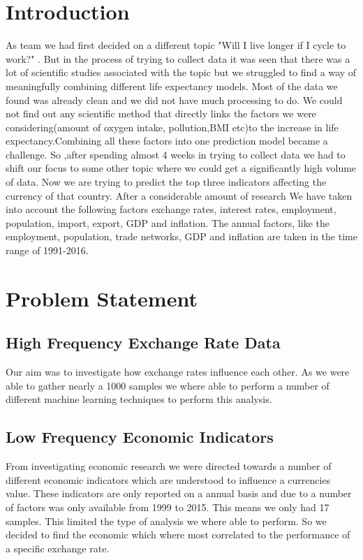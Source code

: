\section{Introduction}
As team we had first decided on a different topic "Will I live longer if I cycle to work?" . But in the process of trying to collect data it was seen that there was a lot of scientific studies associated with the topic but we struggled to find a way of meaningfully combining different life expectancy models.  Most of the data we found was already clean and we did not have much processing to do\cite{iacono2008access}. We could not find out any scientific method that directly links the factors we were considering(amount of oxygen intake, pollution,BMI etc)to the increase in life expectancy\cite{edwards2014spinning}.Combining all these factors into one prediction model became a challenge.
\newline
So ,after spending almost 4 weeks in trying to collect data we had to shift our focus to some other topic where we could get a significantly high volume of data.  Now we are trying to predict the top three indicators affecting the currency of that country.  After a considerable amount of research We have taken into account the following factors exchange rates, interest rates, employment, population, import, export, GDP and inflation\cite{kuruwitaarachchi2018design}.  The annual factors, like the employment, population, trade networks, GDP and inflation are taken in the time range of 1991-2016.

\section{Problem Statement}
\subsection{High Frequency Exchange Rate Data}
Our aim was to investigate how exchange rates influence each other.  As we were able to gather nearly a 1000 samples we where able to perform a number of different machine learning techniques to perform this analysis.

\subsection{Low Frequency Economic Indicators}
From investigating economic research we were directed towards a number of different economic indicators which are understood to influence a currencies value.  These indicators are only reported on a annual basis and due to a number of factors was only available from 1999 to 2015.  This means we only had 17 samples.  This limited the type of analysis we where able to perform. So we decided to find the economic which where most correlated to the performance of a specific exchange rate. 

